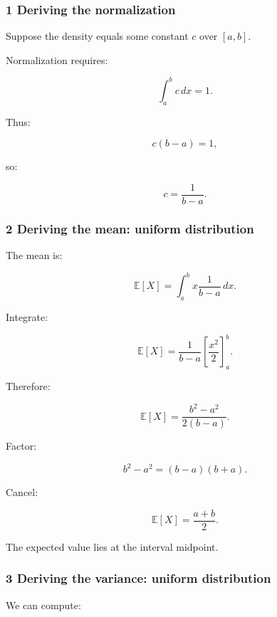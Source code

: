 \subsubsection{1 Deriving the normalization}\label{02-foundations-ii-ch023-deriving-the-normalization}

\hypertarget{02-foundations-ii-ch023-deriving-the-normalization}{}

Suppose the density equals some constant \(c\) over \([a,b]\).

Normalization requires:

\[
 \int_a^bc\,dx=1.
\]

Thus:

\[
 c(b-a)=1,
\]

so:

\[
 \boxed{c=\frac1{b-a}}.
\]

\subsubsection{2 Deriving the mean: uniform distribution}\label{02-foundations-ii-ch023-deriving-the-mean-uniform-distribution}

\hypertarget{02-foundations-ii-ch023-deriving-the-mean-uniform-distribution}{}

The mean is:

\[
 \mathbb E[X] = \int_a^b x\frac1{b-a}\,dx.
\]

Integrate:

\[
 \mathbb E[X] = \frac1{b-a} \left[\frac{x^2}{2}\right]_a^b.
\]

Therefore:

\[
 \mathbb E[X] = \frac{b^2-a^2}{2(b-a)}.
\]

Factor:

\[
 b^2-a^2=(b-a)(b+a).
\]

Cancel:

\[
 \boxed{ \mathbb E[X]=\frac{a+b}{2} }.
\]

The expected value lies at the interval midpoint.

\subsubsection{3 Deriving the variance: uniform distribution}\label{02-foundations-ii-ch023-deriving-the-variance-uniform-distribution}

\hypertarget{02-foundations-ii-ch023-deriving-the-variance-uniform-distribution}{}

We can compute:

